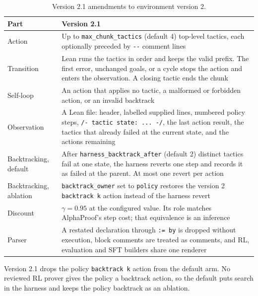 \documentclass[11pt]{article}
\newcommand{\code}[1]{\texttt{#1}}
\begin{document}
\begin{table}[!htbp]
\centering
\small
\caption{Version 2.1 amendments to environment version 2.}
\label{tab:mdp-v21}
\begin{tabularx}{\textwidth}{@{}P{2.6cm}Y@{}}
\toprule
Part & Version 2.1 \\
\midrule
Action & Up to \code{max\_chunk\_tactics} (default 4) top-level tactics, each optionally preceded by \code{-{}-} comment lines \\
Transition & Lean runs the tactics in order and keeps the valid prefix. The first error, unchanged goals, or a cycle stops the action and enters the observation. A closing tactic ends the chunk \\
Self-loop & An action that applies no tactic, a malformed or forbidden action, or an invalid backtrack \\
Observation & A Lean file: header, labelled supplied lines, numbered policy steps, \code{/- tactic state: ... -/}, the last action result, the tactics that already failed at the current state, and the actions remaining \\
Backtracking, default & After \code{harness\_backtrack\_after} (default 2) distinct tactics fail at one state, the harness reverts one step and records it as failed at the parent. At most one revert per action \\
Backtracking, ablation & \code{backtrack\_owner} set to \code{policy} restores the version 2 \code{backtrack k} action instead of the harness revert \\
Discount & $\gamma = 0.95$ at the configured value. Its role matches AlphaProof's step cost; that equivalence is an inference \\
Parser & A restated declaration through \code{:= by} is dropped without execution, block comments are treated as comments, and RL, evaluation and SFT builders share one renderer \\
\bottomrule
\end{tabularx}
\end{table}

Version 2.1 drops the policy \code{backtrack k} action from the default arm.
No reviewed RL prover gives the policy a backtrack action, so the default puts search in the harness and keeps the policy backtrack as an ablation.
\end{document}
